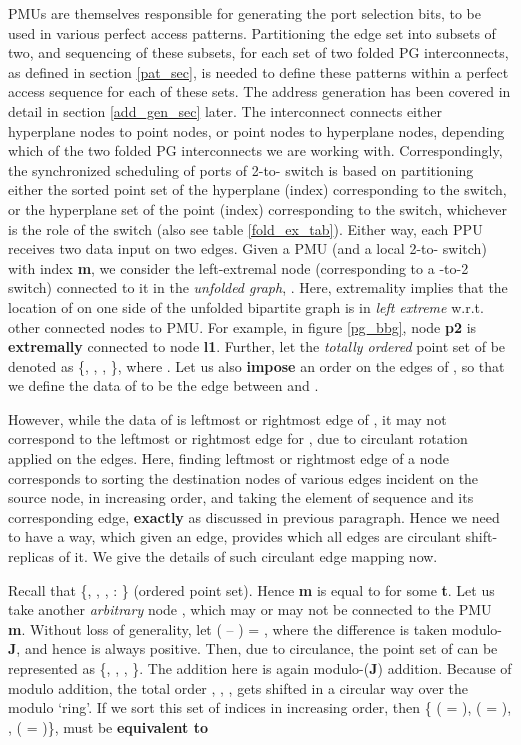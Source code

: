 \documentclass[12pt]{article}
\begin{document}
PMUs are themselves responsible for generating the
port selection bits, to be used in various perfect access patterns.
Partitioning the edge set into subsets of two, and sequencing of these subsets,
for each set of two folded PG
interconnects, as defined in section \ref{pat_sec}, is needed to define
these patterns within a perfect access sequence for each of these sets. The
address generation has been covered in detail in section \ref{add_gen_sec}
later. The interconnect connects either hyperplane nodes to point
nodes, or point nodes to hyperplane nodes, depending which of the two
folded PG interconnects we are working with.
Correspondingly, the synchronized scheduling of ports of
2-to- switch is
based on partitioning either the sorted point set of the hyperplane (index)
corresponding to the switch, or the hyperplane set of the point (index)
corresponding to the switch, whichever is the role of the switch (also see
table \ref{fold_ex_tab}). Either way, each
PPU receives two data input on two edges. Given a PMU (and a local 2-to- switch) with
index \textbf{m}, we consider the left-extremal node
(corresponding to a -to-2 switch) connected to it in the
\textit{unfolded graph}, . Here, extremality implies that the
location of  on one side of the unfolded bipartite
graph is in \textit{left extreme} w.r.t.  other connected nodes to
 PMU. For example, in figure
\ref{pg_bbg}, node \textbf{p2} is \textbf{extremally} connected to
node \textbf{l1}. Further, let the \textit{totally ordered}
point set of  be denoted as \{, , , \}, where       . Let us also \textbf{impose} an order on the edges of
, so that we define the  data of  to be the edge
between  and .

However, while the  data of  is  leftmost or
rightmost edge of , it may not correspond to the  leftmost
or rightmost edge for , due to circulant rotation applied on the
edges. Here, finding  leftmost or rightmost edge of a node
corresponds to sorting the destination nodes of various edges incident on
the source node, in increasing order, and taking the  element of
sequence and its corresponding edge, \textbf{exactly} as discussed in
previous paragraph. Hence we need to
have a way, which given an edge, provides which all edges are circulant
shift-replicas of it. We give the details of such circulant edge
mapping now.

Recall that   \{, , , 
:       
\} (ordered point set).
Hence \textbf{m} is equal to  for some \textbf{t}. Let us
take another \textit{arbitrary} node , which may or may not be
connected to the PMU \textbf{m}. Without loss of generality, let
( -- ) = , where the difference is taken
modulo-\textbf{J}, and hence is always positive.
Then, due to circulance, the point set of  can be
represented as \{, , , \}. The addition here is again modulo-(\textbf{J}) addition. Because
of modulo addition, the total order , , ,
 gets shifted in a circular way over the modulo `ring'.
If we sort this set of
indices in increasing order, then \{ ( = ),
 ( = ), ,
 ( = )\}, must
be \textbf{equivalent to}      
       
\end{document}
